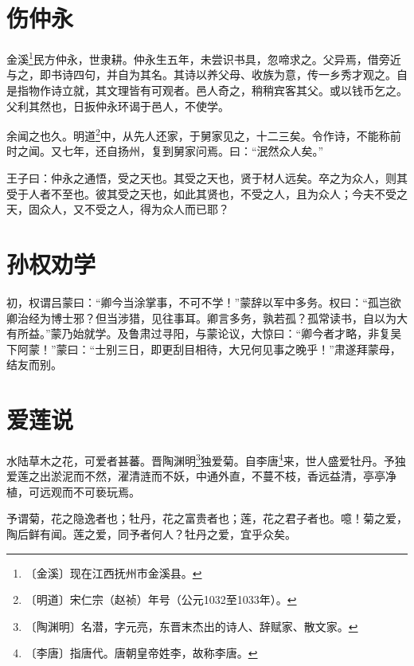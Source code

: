 \documentclass[12pt,UTF-8,openany]{ctexbook}
\begin{document}
\chapter{伤仲永}

\begin{normalsize}
    
    金溪\footnote{〔金溪〕现在江西抚州市金溪县。}民方仲永，世隶耕。仲永生五年，未尝识书具，忽啼求之。父异焉，借旁近与之，即书诗四句，并自为其名。其诗以养父母、收族为意，传一乡秀才观之。自是指物作诗立就，其文理皆有可观者。邑人奇之，稍稍宾客其父。或以钱币乞之。父利其然也，日扳仲永环谒于邑人，不使学。
    
    余闻之也久。明道\footnote{〔明道〕宋仁宗（赵祯）年号（公元1032至1033年）。}中，从先人还家，于舅家见之，十二三矣。令作诗，不能称前时之闻。又七年，还自扬州，复到舅家问焉。曰：“泯然众人矣。”
    
    王子曰：仲永之通悟，受之天也。其受之天也，贤于材人远矣。卒之为众人，则其受于人者不至也。彼其受之天也，如此其贤也，不受之人，且为众人；今夫不受之天，固众人，又不受之人，得为众人而已耶？
\end{normalsize}



\chapter{孙权劝学}

\begin{normalsize}
    
    初，权谓吕蒙曰：“卿今当涂掌事，不可不学！”蒙辞以军中多务。权曰：“孤岂欲卿治经为博士邪？但当涉猎，见往事耳。卿言多务，孰若孤？孤常读书，自以为大有所益。”蒙乃始就学。及鲁肃过寻阳，与蒙论议，大惊曰：“卿今者才略，非复吴下阿蒙！”蒙曰：“士别三日，即更刮目相待，大兄何见事之晚乎！”肃遂拜蒙母，结友而别。
\end{normalsize}



\chapter{爱莲说}

\begin{normalsize}
    
    水陆草木之花，可爱者甚蕃。晋陶渊明\footnote{〔陶渊明〕名潜，字元亮，东晋末杰出的诗人、辞赋家、散文家。}独爱菊。自李唐\footnote{〔李唐〕指唐代。唐朝皇帝姓李，故称李唐。}来，世人盛爱牡丹。予独爱莲之出淤泥而不然，濯清涟而不妖，中通外直，不蔓不枝，香远益清，亭亭净植，可远观而不可亵玩焉。
    
    予谓菊，花之隐逸者也；牡丹，花之富贵者也；莲，花之君子者也。噫！菊之爱，陶后鲜有闻。莲之爱，同予者何人？牡丹之爱，宜乎众矣。
\end{normalsize}
\end{document}
